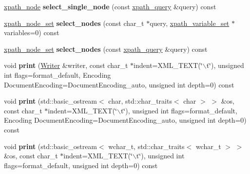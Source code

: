 \begin{DoxyCompactItemize}
\item 
\hypertarget{classphys_1_1xml_1_1Node_a6e63ac46658ba2484bf58d47f4fb4044}{
\hyperlink{classphys_1_1xml_1_1xpath__node}{xpath\_\-node} {\bfseries select\_\-single\_\-node} (const \hyperlink{classphys_1_1xml_1_1xpath__query}{xpath\_\-query} \&query) const }
\label{d7/d0a/classphys_1_1xml_1_1Node_a6e63ac46658ba2484bf58d47f4fb4044}

\item 
\hypertarget{classphys_1_1xml_1_1Node_ad59ea495afeb7bdfba213d0d77699bdc}{
\hyperlink{classphys_1_1xml_1_1xpath__node__set}{xpath\_\-node\_\-set} {\bfseries select\_\-nodes} (const char\_\-t $\ast$query, \hyperlink{classphys_1_1xml_1_1xpath__variable__set}{xpath\_\-variable\_\-set} $\ast$variables=0) const }
\label{d7/d0a/classphys_1_1xml_1_1Node_ad59ea495afeb7bdfba213d0d77699bdc}

\item 
\hypertarget{classphys_1_1xml_1_1Node_a283417484d52b3e4646affac0f84b068}{
\hyperlink{classphys_1_1xml_1_1xpath__node__set}{xpath\_\-node\_\-set} {\bfseries select\_\-nodes} (const \hyperlink{classphys_1_1xml_1_1xpath__query}{xpath\_\-query} \&query) const }
\label{d7/d0a/classphys_1_1xml_1_1Node_a283417484d52b3e4646affac0f84b068}

\item 
\hypertarget{classphys_1_1xml_1_1Node_af48a131c36d0452558a937fac9058224}{
void {\bfseries print} (\hyperlink{classphys_1_1xml_1_1Writer}{Writer} \&writer, const char\_\-t $\ast$indent=XML\_\-TEXT(\char`\"{}$\backslash$t\char`\"{}), unsigned int flags=format\_\-default, Encoding DocumentEncoding=DocumentEncoding\_\-auto, unsigned int depth=0) const }
\label{d7/d0a/classphys_1_1xml_1_1Node_af48a131c36d0452558a937fac9058224}

\item 
\hypertarget{classphys_1_1xml_1_1Node_a26bfc3ab0b88699f0ad04f7645c9bef7}{
void {\bfseries print} (std::basic\_\-ostream$<$ char, std::char\_\-traits$<$ char $>$ $>$ \&os, const char\_\-t $\ast$indent=XML\_\-TEXT(\char`\"{}$\backslash$t\char`\"{}), unsigned int flags=format\_\-default, Encoding DocumentEncoding=DocumentEncoding\_\-auto, unsigned int depth=0) const }
\label{d7/d0a/classphys_1_1xml_1_1Node_a26bfc3ab0b88699f0ad04f7645c9bef7}

\item 
\hypertarget{classphys_1_1xml_1_1Node_af879d58cf08553c5f2dfa813e7a56ce6}{
void {\bfseries print} (std::basic\_\-ostream$<$ wchar\_\-t, std::char\_\-traits$<$ wchar\_\-t $>$ $>$ \&os, const char\_\-t $\ast$indent=XML\_\-TEXT(\char`\"{}$\backslash$t\char`\"{}), unsigned int flags=format\_\-default, unsigned int depth=0) const }
\label{d7/d0a/classphys_1_1xml_1_1Node_af879d58cf08553c5f2dfa813e7a56ce6}


\end{DoxyCompactItemize}
